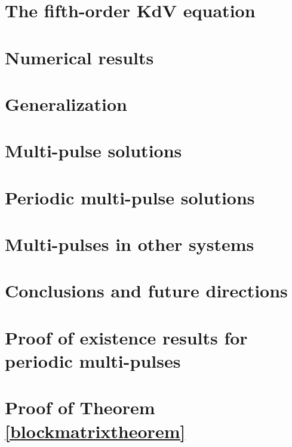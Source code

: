 \documentclass[11pt,reqno,oneside]{report}
\theoremstyle{plain}
\theoremstyle{definition}
\theoremstyle{remark}
\numberwithin{section}{chapter}
\numberwithin{equation}{chapter}
\numberwithin{figure}{chapter}
\begin{document}
\chapter{The fifth-order KdV equation}\label{chapter:KdV5}


\chapter{Numerical results}\label{chapter:KdV5numerics}


\chapter{Generalization}\label{chapter:kdv5general}



\chapter{Multi-pulse solutions}\label{chapter:kdv5homoclinic}


\chapter{Periodic multi-pulse solutions }\label{chapter:kdv5periodic}


\chapter{Multi-pulses in other systems}\label{chapter:other}


\chapter{Conclusions and future directions}


\appendix

\chapter{Proof of existence results for periodic multi-pulses}\label{perexistproof}


\chapter{Proof of Theorem \ref{blockmatrixtheorem}}\label{blockmatrixproof}


\end{document}
